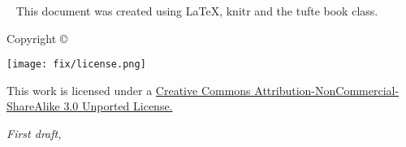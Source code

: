 \begin{fullwidth}
~\vfill
\thispagestyle{empty}
\setlength{\parindent}{0pt}
\setlength{\parskip}{\baselineskip}
This document was created using \LaTeX, knitr and the tufte book class.


Copyright \copyright\ \the\year\ \thanklessauthor


\leavevmode
\texttt{[image: fix/license.png]}
\label{fig:cc}

\scriptsize{This work is licensed under a \href{http://creativecommons.org/licenses/by-nc-sa/3.0/deed.en_US}{Creative Commons Attribution-NonCommercial-ShareAlike 3.0 Unported License.}}


\par\textit{First draft, \monthyear}
\end{fullwidth} 
